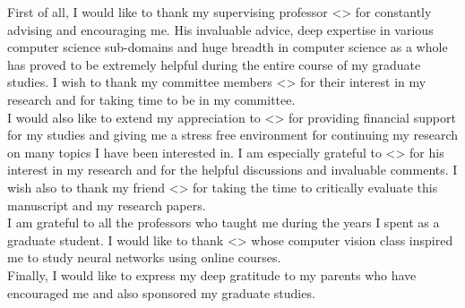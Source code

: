 First of all, I would like to thank my supervising professor <> for constantly advising 
and encouraging me. His invaluable advice, deep expertise in various computer science sub-domains and huge breadth in computer science as a whole has proved to be extremely helpful during the entire course of my graduate studies.
I wish to thank my committee members <> for their interest in my research and for taking time to
be in my committee.\\

I would also like to extend my appreciation to <> for providing 
financial support for my studies and giving me a stress free  environment for continuing my research on many topics I have been interested in. I am especially grateful to <> for  his interest in my research and for the helpful discussions and invaluable comments. I wish also to thank my friend <> for taking the time to critically evaluate this manuscript and my research papers.\\

I am grateful to all the professors who taught me during the years I spent as a graduate student. I would like to thank <> whose computer vision class inspired me to study neural networks using online courses. \\

Finally, I would like to express my deep gratitude to my parents 
who have encouraged me and also sponsored my graduate studies. 